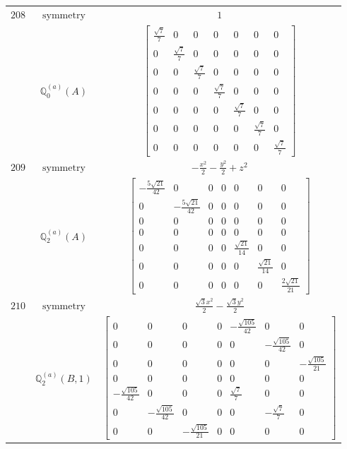 \documentclass[fleqn,8pt,landscape]{jsarticle}
\begin{document}
\begin{longtable}{ccc}
$ 208 $ & $ \text{symmetry} $ & $ 1 $ \\
$  $ & $ \mathbb{Q}_{0}^{(a)}(A) $ & $ \begin{bmatrix} \frac{\sqrt{7}}{7} & 0 & 0 & 0 & 0 & 0 & 0 \\ 0 & \frac{\sqrt{7}}{7} & 0 & 0 & 0 & 0 & 0 \\ 0 & 0 & \frac{\sqrt{7}}{7} & 0 & 0 & 0 & 0 \\ 0 & 0 & 0 & \frac{\sqrt{7}}{7} & 0 & 0 & 0 \\ 0 & 0 & 0 & 0 & \frac{\sqrt{7}}{7} & 0 & 0 \\ 0 & 0 & 0 & 0 & 0 & \frac{\sqrt{7}}{7} & 0 \\ 0 & 0 & 0 & 0 & 0 & 0 & \frac{\sqrt{7}}{7} \end{bmatrix} $ \\ \hline
$ 209 $ & $ \text{symmetry} $ & $ - \frac{x^{2}}{2} - \frac{y^{2}}{2} + z^{2} $ \\
$  $ & $ \mathbb{Q}_{2}^{(a)}(A) $ & $ \begin{bmatrix} - \frac{5 \sqrt{21}}{42} & 0 & 0 & 0 & 0 & 0 & 0 \\ 0 & - \frac{5 \sqrt{21}}{42} & 0 & 0 & 0 & 0 & 0 \\ 0 & 0 & 0 & 0 & 0 & 0 & 0 \\ 0 & 0 & 0 & 0 & 0 & 0 & 0 \\ 0 & 0 & 0 & 0 & \frac{\sqrt{21}}{14} & 0 & 0 \\ 0 & 0 & 0 & 0 & 0 & \frac{\sqrt{21}}{14} & 0 \\ 0 & 0 & 0 & 0 & 0 & 0 & \frac{2 \sqrt{21}}{21} \end{bmatrix} $ \\ \hline
$ 210 $ & $ \text{symmetry} $ & $ \frac{\sqrt{3} x^{2}}{2} - \frac{\sqrt{3} y^{2}}{2} $ \\
$  $ & $ \mathbb{Q}_{2}^{(a)}(B,1) $ & $ \begin{bmatrix} 0 & 0 & 0 & 0 & - \frac{\sqrt{105}}{42} & 0 & 0 \\ 0 & 0 & 0 & 0 & 0 & - \frac{\sqrt{105}}{42} & 0 \\ 0 & 0 & 0 & 0 & 0 & 0 & - \frac{\sqrt{105}}{21} \\ 0 & 0 & 0 & 0 & 0 & 0 & 0 \\ - \frac{\sqrt{105}}{42} & 0 & 0 & 0 & \frac{\sqrt{7}}{7} & 0 & 0 \\ 0 & - \frac{\sqrt{105}}{42} & 0 & 0 & 0 & - \frac{\sqrt{7}}{7} & 0 \\ 0 & 0 & - \frac{\sqrt{105}}{21} & 0 & 0 & 0 & 0 \end{bmatrix} $ \\ \hline

\end{longtable}
\end{document}
